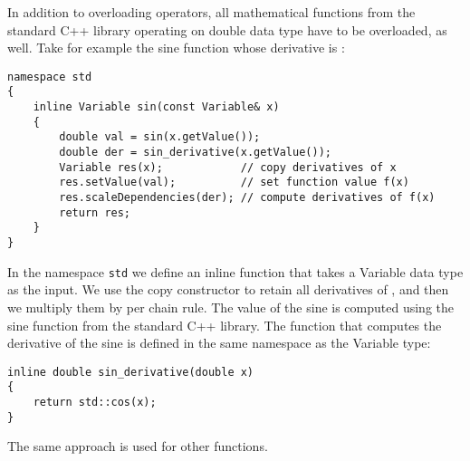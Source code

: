 \documentclass[10pt]{ijnam}
\theoremstyle{definition}
\begin{document}
In addition to overloading operators, all mathematical functions from the standard C++ library 
operating on double data type have to be overloaded, as well. Take for example the
sine function whose derivative is :
\begin{lstlisting}
namespace std
{
    inline Variable sin(const Variable& x)
    {                                         
        double val = sin(x.getValue());                         
        double der = sin_derivative(x.getValue());               
        Variable res(x);            // copy derivatives of x
        res.setValue(val);          // set function value f(x)
        res.scaleDependencies(der); // compute derivatives of f(x)
        return res;
    }
}
\end{lstlisting}
In the namespace \texttt{std} we define an inline function that takes a
Variable data type as the input. We use the copy constructor to retain 
all derivatives of , and then we multiply them by  per 
chain rule. The value of the sine is computed using the sine function from the
standard C++ library. The function that computes the derivative of the sine
is defined in the same namespace as the Variable type:
\begin{lstlisting}
inline double sin_derivative(double x)
{
    return std::cos(x);
}
\end{lstlisting}
The same approach is used for other functions. 
\end{document}
